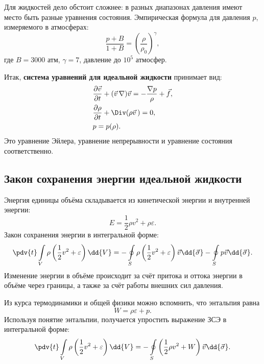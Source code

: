 Для жидкостей дело обстоит сложнее: в разных диапазонах давления имеют место быть разные уравнения состояния. Эмпирическая формула для давления $p$, измеряемого в атмосферах:
\begin{equation}
\frac { p + B } { 1 + B } = \left( \frac { \rho } { \rho_0 } \right) ^ { \gamma }\!\!,
\end{equation}
где $B=3000\text{ атм}$, $\gamma = 7$, давление до $10^5$ атмосфер.

Итак, \textbf{система уравнений для идеальной жидкости} принимает вид:
\begin{equation}\begin{aligned}
& \frac { \partial \vec{v} } { \partial t } + ( \vec{v}\,\nabla ) \vec{v} = - \frac { \nabla p } { \rho } + \vec { f }, \\
& \frac { \partial \rho } { \partial t } + \Div ( \rho \vec{v}\,) = 0,\\
& p = p ( \rho ).
\end{aligned}\end{equation}
Это уравнение Эйлера, уравнение непрерывности и уравнение состояния соответственно.

\subsection{Закон сохранения энергии идеальной жидкости}

Энергия единицы объёма складывается из кинетической энергии и  внутренней энергии:
\begin{equation}
E = \frac { 1 } { 2 } \rho v^2 + \rho \varepsilon.
\end{equation}
Закон сохранения энергии в интегральной форме:
\begin{equation}
\pdv{t} \int\limits_{ V } \rho \left( \frac { 1 } { 2 } v^2 + \varepsilon \right)\dd{V} = - \oint\limits_{ S } \rho \left( \frac { 1 } { 2 } v^2 + \varepsilon \right) \vec{v} \dd{\vec{\sigma}} - \oint \limits_ { S } p \vec{v} \dd{\vec{\sigma}}.
\end{equation}
Изменение энергии в объёме происходит за счёт притока и оттока энергии в объёме через границы, а также за счёт работы внешних сил давления.

Из курса термодинамики и общей физики можно вспомнить, что энтальпия равна
\begin{equation}
	W = \rho \varepsilon + p.
\end{equation}
Используя понятие энтальпии, получается упростить выражение ЗСЭ в интегральной форме:
\begin{equation}
\pdv{t} \int \limits_{ V } \rho \left( \frac { 1 } { 2 } v^2 + \varepsilon \right)\dd{V} = - \oint \limits_{ S }  \left( \frac { 1 } { 2 } \rho v^2 + W \right) \vec{v} \dd{\vec{\sigma}}.
\end{equation}

